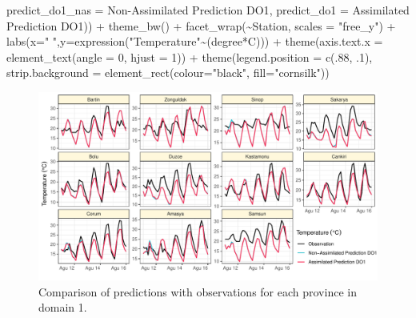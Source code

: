 \documentclass[
  letterpaper,
  DIV=11,
  numbers=noendperiod,
  abstract]{scrartcl}
\newenvironment{Shaded}{\begin{snugshade}}{\end{snugshade}}
\newcommand{\AttributeTok}[1]{\textcolor[rgb]{0.40,0.45,0.13}{#1}}
\newcommand{\DecValTok}[1]{\textcolor[rgb]{0.68,0.00,0.00}{#1}}
\newcommand{\FunctionTok}[1]{\textcolor[rgb]{0.28,0.35,0.67}{#1}}
\newcommand{\NormalTok}[1]{\textcolor[rgb]{0.00,0.23,0.31}{#1}}
\newcommand{\OtherTok}[1]{\textcolor[rgb]{0.00,0.23,0.31}{#1}}
\newcommand{\SpecialCharTok}[1]{\textcolor[rgb]{0.37,0.37,0.37}{#1}}
\newcommand{\StringTok}[1]{\textcolor[rgb]{0.13,0.47,0.30}{#1}}
\begin{document}
\begin{Shaded}
\begin{Highlighting}[]
                     \StringTok{\textquotesingle{}predict\_do1\_nas\textquotesingle{}} \OtherTok{=} \StringTok{\textquotesingle{}Non{-}Assimilated Prediction DO1\textquotesingle{}}\NormalTok{,}
                     \StringTok{\textquotesingle{}predict\_do1\textquotesingle{}} \OtherTok{=} \StringTok{\textquotesingle{}Assimilated Prediction DO1\textquotesingle{}}\NormalTok{)) }\SpecialCharTok{+} 
  \FunctionTok{theme\_bw}\NormalTok{() }\SpecialCharTok{+} \FunctionTok{facet\_wrap}\NormalTok{(}\SpecialCharTok{\textasciitilde{}}\NormalTok{Station, }\AttributeTok{scales =} \StringTok{"free\_y"}\NormalTok{) }\SpecialCharTok{+} 
  \FunctionTok{labs}\NormalTok{(}\AttributeTok{x=}\StringTok{" "}\NormalTok{,}\AttributeTok{y=}\FunctionTok{expression}\NormalTok{(}\StringTok{"Temperature"}\SpecialCharTok{\textasciitilde{}}\NormalTok{(degree}\SpecialCharTok{*}\NormalTok{C))) }\SpecialCharTok{+} 
  \FunctionTok{theme}\NormalTok{(}\AttributeTok{axis.text.x =} \FunctionTok{element\_text}\NormalTok{(}\AttributeTok{angle =} \DecValTok{0}\NormalTok{, }\AttributeTok{hjust =} \DecValTok{1}\NormalTok{))  }\SpecialCharTok{+}
  \FunctionTok{theme}\NormalTok{(}\AttributeTok{legend.position =} \FunctionTok{c}\NormalTok{(.}\DecValTok{88}\NormalTok{, .}\DecValTok{1}\NormalTok{), }
        \AttributeTok{strip.background =} \FunctionTok{element\_rect}\NormalTok{(}\AttributeTok{colour=}\StringTok{"black"}\NormalTok{, }\AttributeTok{fill=}\StringTok{"cornsilk"}\NormalTok{))}
\end{Highlighting}
\end{Shaded}

\begin{figure}[H]

{\centering \includegraphics{WRF_pdf_files/figure-pdf/fig-do1-1.pdf}

}

\caption{\label{fig-do1}Comparison of predictions with observations for
each province in domain 1.}

\end{figure}
\end{document}

